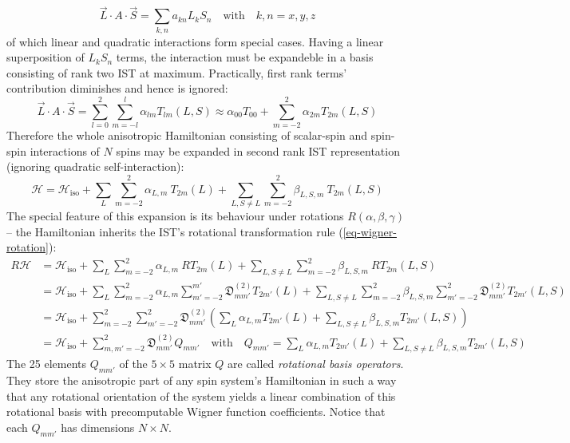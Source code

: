 \documentclass[11.5pt,a4paper]{article}
\begin{document}
\begin{equation}
 \vec{L} \cdot A \cdot \vec{S} = \sum_{k,n} a_{kn} L_k S_n \quad \text{with} \quad  k,n = x,y,z
\end{equation}
of which linear and quadratic interactions form special cases. Having a linear superposition of $L_k S_n$ terms, the interaction must be expandeble in a basis consisting of rank two IST at maximum. Practically, first rank terms' contribution diminishes and hence is ignored:
\begin{equation}
 \vec{L} \cdot A \cdot \vec{S} = \sum_{l=0}^2 \sum_{m=-l}^l \alpha_{lm} T_{lm} (L,S) \approx \alpha_{00} T_{00} + \sum_{m=-2}^2 \alpha_{2m} T_{2m}(L,S)
\end{equation}
Therefore the whole anisotropic Hamiltonian consisting of scalar-spin and spin-spin interactions of $N$ spins may be expanded in second rank IST representation (ignoring quadratic self-interaction):
\begin{equation}
 \mathcal{H} = \mathcal{H}_{\text{iso}} + \sum_L \sum_{m=-2}^2 \alpha_{L,m}\ T_{2m} (L) + \sum_{L,S\neq L} \sum_{m=-2}^{2} \beta_{L,S,m}\ T_{2m}(L,S)
\end{equation}
The special feature of this expansion is its behaviour under rotations $R(\alpha,\beta,\gamma)$ -- the Hamiltonian inherits the IST's rotational transformation rule (\ref{eq-wigner-rotation}):
\begin{align}
 R \mathcal{H} & = \mathcal{H}_\text{iso} +  \sum_L \sum_{m=-2}^2 \alpha_{L,m}\ R T_{2m} (L) + \sum_{L,S\neq L} \sum_{m=-2}^{2} \beta_{L,S,m}\ R T_{2m}(L,S) \\
  & = \mathcal{H}_\text{iso} +  \sum_L \sum_{m=-2}^2 \alpha_{L,m} \sum_{m'=-2}^{m'} \mathfrak{D}_{mm'}^{(2)} T_{2m'} (L) + \sum_{L,S\neq L} \sum_{m=-2}^{2} \beta_{L,S,m} \sum_{m'=-2}^{2} \mathfrak{D}_{mm'}^{(2)} T_{2m'}(L,S) \\
  & = \mathcal{H}_\text{iso} +  \sum_{m=-2}^2 \sum_{m'=-2}^{2} \mathfrak{D}_{mm'}^{(2)}  \left( \sum_L  \alpha_{L,m} T_{2m'} (L) + \sum_{L,S\neq L} \beta_{L,S,m} T_{2m'}(L,S) \right)\\
  & =  \mathcal{H}_\text{iso} +  \sum_{m,m'=-2}^{2} \mathfrak{D}_{mm'}^{(2)} Q_{mm'} \quad \text{with} \quad 
  Q_{mm'} = \sum_L  \alpha_{L,m} T_{2m'} (L) + \sum_{L,S\neq L} \beta_{L,S,m} T_{2m'}(L,S)
\end{align}
The 25 elements $Q_{mm'}$ of the $5\times 5$ matrix $Q$ are called \emph{rotational basis operators}. They store the anisotropic part of any spin system's Hamiltonian in such a way that any rotational orientation of the system yields a linear combination of this rotational basis with precomputable Wigner function coefficients. Notice that each $Q_{mm'}$ has dimensions $N \times N$.  
\end{document}

